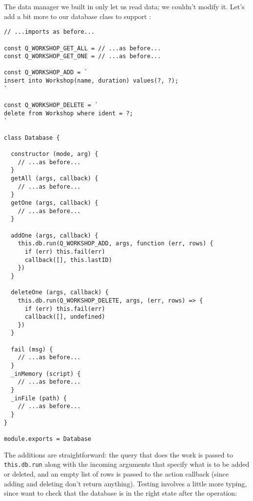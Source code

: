 The data manager we built in  only let us read data;
we couldn't modify it.
Let's add a bit more to our database class to support :

\begin{verbatim}
// ...imports as before...

const Q_WORKSHOP_GET_ALL = // ...as before...
const Q_WORKSHOP_GET_ONE = // ...as before...

const Q_WORKSHOP_ADD = `
insert into Workshop(name, duration) values(?, ?);
`

const Q_WORKSHOP_DELETE = `
delete from Workshop where ident = ?;
`

class Database {

  constructor (mode, arg) {
    // ...as before...
  }
  getAll (args, callback) {
    // ...as before...
  }
  getOne (args, callback) {
    // ...as before...
  }

  addOne (args, callback) {
    this.db.run(Q_WORKSHOP_ADD, args, function (err, rows) {
      if (err) this.fail(err)
      callback([], this.lastID)
    })
  }

  deleteOne (args, callback) {
    this.db.run(Q_WORKSHOP_DELETE, args, (err, rows) => {
      if (err) this.fail(err)
      callback([], undefined)
    })
  }

  fail (msg) {
    // ...as before...
  }
  _inMemory (script) {
    // ...as before...
  }
  _inFile (path) {
    // ...as before...
  }
}

module.exports = Database
\end{verbatim}

The additions are straightforward:
the query that does the work is passed to \texttt{this.db.run} along with the incoming arguments
that specify what is to be added or deleted,
and an empty list of rows is passed to the action callback
(since adding and deleting don't return anything).
Testing involves a little more typing,
since want to check that the database is in the right state after the operation:

